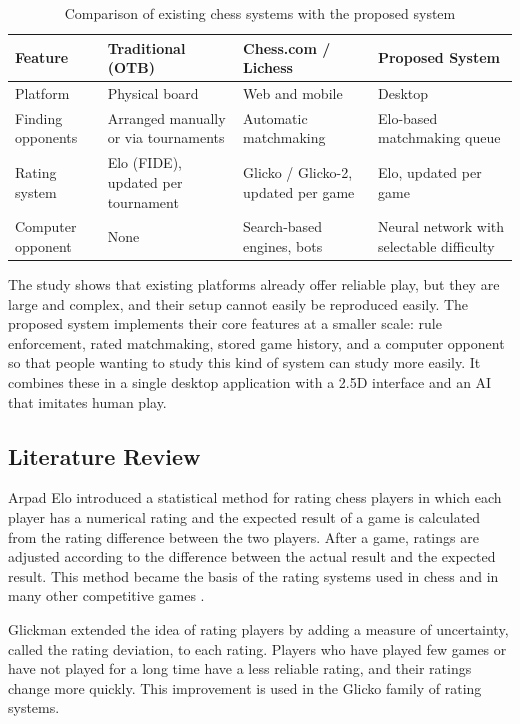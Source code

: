 \begin{table}[H]
\centering
\small
\renewcommand{\arraystretch}{1.25}
\begin{tabular}{|p{2.9cm}|p{3.4cm}|p{3.4cm}|p{3.4cm}|}
\hline
\textbf{Feature} & \textbf{Traditional (OTB)} & \textbf{Chess.com / Lichess} & \textbf{Proposed System} \\ \hline
Platform & Physical board & Web and mobile & Desktop \\ \hline
Finding opponents & Arranged manually or via tournaments & Automatic matchmaking & Elo-based matchmaking queue \\ \hline
Rating system & Elo (FIDE), updated per tournament & Glicko / Glicko-2, updated per game & Elo, updated per game \\ \hline
Computer opponent & None & Search-based engines, bots & Neural network with selectable difficulty \\ \hline
\end{tabular}
\caption{Comparison of existing chess systems with the proposed system}
\label{tab:comparison}
\end{table}

The study shows that existing platforms already offer reliable play, but they are large and complex, and their setup cannot easily be reproduced easily. The proposed system implements their core features at a smaller scale: rule enforcement, rated matchmaking, stored game history, and a computer opponent so that people wanting to study this kind of system can study more easily. It combines these in a single desktop application with a 2.5D interface and an AI that imitates human play.

\subsection{Literature Review}
\label{sec:lit}

Arpad Elo introduced a statistical method for rating chess players in which each player has a numerical rating and the expected result of a game is calculated from the rating difference between the two players. After a game, ratings are adjusted according to the difference between the actual result and the expected result. This method became the basis of the rating systems used in chess and in many other competitive games \cite{elo1978rating}.

Glickman extended the idea of rating players by adding a measure of uncertainty, called the rating deviation, to each rating. Players who have played few games or have not played for a long time have a less reliable rating, and their ratings change more quickly. This improvement is used in the Glicko family of rating systems.

